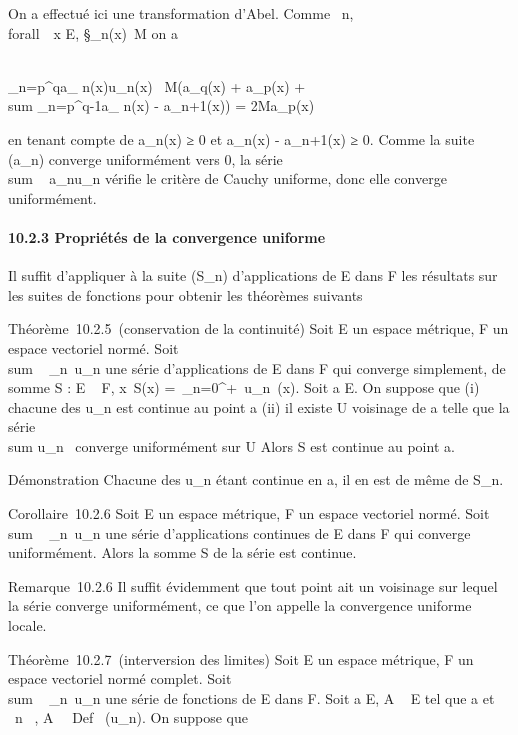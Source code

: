\documentclass[]{article}
\begin{document}
On a effectué ici une transformation d'Abel. Comme
\forall~n, \\forall~~x \in E,
\S_n(x)\ \leq M
on a

\\\sum
_n=p^qa_
n(x)u_n(x)\ \leq
M(a_q(x) +
a_p(x) + \\sum
_n=p^q-1a_ n(x) -
a_n+1(x)) = 2Ma_p(x)

en tenant compte de a_n(x) ≥ 0 et a_n(x) -
a_n+1(x) ≥ 0. Comme la suite (a_n) converge
uniformément vers 0, la série
\\sum ~
a_nu_n vérifie le critère de Cauchy uniforme, donc
elle converge uniformément.

\paragraph{10.2.3 Propriétés de la convergence uniforme}

Il suffit d'appliquer à la suite (S_n) d'applications de E dans
F les résultats sur les suites de fonctions pour obtenir les théorèmes
suivants

Théorème~10.2.5~(conservation de la continuité) Soit E un espace
métrique, F un espace vectoriel normé. Soit
\\sum ~
_n\in{}~u_n une série d'applications de E dans F qui
converge simplement, de somme S : E \rightarrow~ F,
x\mapsto~S(x) =\
\sum  _n=0^+\infty~u_n~(x).
Soit a \in E. On suppose que (i) chacune des u_n est continue au
point a (ii) il existe U voisinage de a telle que la série
\\sum  u_n~
converge uniformément sur U Alors S est continue au point a.

Démonstration Chacune des u_n étant continue en a, il en est de
même de S_n.

Corollaire~10.2.6 Soit E un espace métrique, F un espace vectoriel
normé. Soit \\sum ~
_n\in{}~u_n une série d'applications continues de E dans F
qui converge uniformément. Alors la somme S de la série est continue.

Remarque~10.2.6 Il suffit évidemment que tout point ait un voisinage sur
lequel la série converge uniformément, ce que l'on appelle la
convergence uniforme locale.

Théorème~10.2.7~(interversion des limites) Soit E un espace métrique, F
un espace vectoriel normé complet. Soit
\\sum ~
_n\in{}~u_n une série de fonctions de E dans F. Soit a \in E,
A \subset~ E tel que a \in\overlineA et
\forall~n \in {}~, A \subset~\ Def~
(u_n). On suppose que
\end{document}
